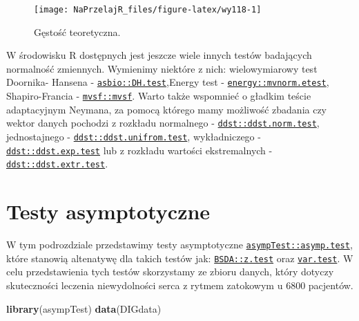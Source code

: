 \documentclass[polish,]{book}
\newenvironment{Shaded}{\begin{snugshade}}{\end{snugshade}}
\newcommand{\KeywordTok}[1]{\textcolor[rgb]{0.13,0.29,0.53}{\textbf{#1}}}
\newcommand{\NormalTok}[1]{#1}
\begin{document}
\begin{figure}[h]

{\centering \texttt{[image: NaPrzelajR\_files/figure-latex/wy118-1]} 

}

\caption{Gęstość teoretyczna.}\label{fig:wy118}
\end{figure}

W środowisku R dostępnych jest jeszcze wiele innych testów badających normalność zmiennych. Wymienimy niektóre z nich: wielowymiarowy test Doornika-
Hansena - \href{https://rdrr.io/cran/asbio/man/DH.test.html}{\texttt{asbio::DH.test}},Energy test - \href{https://rdrr.io/cran/energy/man/mvnorm-etest.html}{\texttt{energy::mvnorm.etest}}, Shapiro-Francia
- \href{https://rdrr.io/cran/mvsf/man/mvsf.html}{\texttt{mvsf::mvsf}}. Warto także wspomnieć o gładkim teście adaptacyjnym Neymana, za
pomocą którego mamy możliwość zbadania czy wektor danych pochodzi z rozkładu
normalnego - \href{https://rdrr.io/cran/ddst/man/ddst.norm.test.html}{\texttt{ddst::ddst.norm.test}}, jednostajnego - \href{https://rdrr.io/cran/ddst/man/ddst.uniform.test.html}{\texttt{ddst::ddst.unifrom.test}},
wykładniczego - \href{https://rdrr.io/cran/ddst/man/ddst.exp.test.html}{\texttt{ddst::ddst.exp.test}} lub z rozkładu wartości ekstremalnych -
\href{https://rdrr.io/cran/ddst/man/ddst.extr.test.html}{\texttt{ddst::ddst.extr.test}}.

\hypertarget{part_11.2}{%
\section{Testy asymptotyczne}\label{part_11.2}}

W tym podrozdziale przedstawimy testy asymptotyczne \href{https://rdrr.io/cran/asympTest/man/asymp.test.html}{\texttt{asympTest::asymp.test}},
które stanowią altenatywę dla takich testów jak: \href{https://rdrr.io/cran/BSDA/man/z.test.html}{\texttt{BSDA::z.test}} oraz \href{https://rdrr.io/r/stats/var.test.html}{\texttt{var.test}}.
W celu przedstawienia tych testów skorzystamy ze zbioru danych, który dotyczy skuteczności leczenia niewydolności serca z rytmem zatokowym u 6800 pacjentów.

\begin{Shaded}
\begin{Highlighting}[]
\KeywordTok{library}\NormalTok{(asympTest)}
\KeywordTok{data}\NormalTok{(DIGdata)}
\end{Highlighting}
\end{Shaded}
\end{document}
